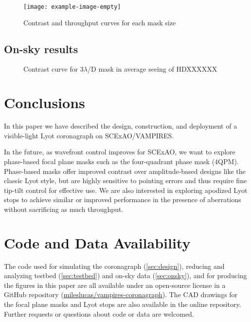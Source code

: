 \documentclass[]{spie}  %
\begin{document}
\begin{figure}
   \centering
   \texttt{[image: example-image-empty]}
   \caption{Contrast and throughput curves for each mask size}\label{fig:contrast}
\end{figure}

\subsection{On-sky results}\label{sec:onsky}


\begin{figure}
   \centering
   \caption{Contrast curve for 3$\lambda$/D mask in average seeing of HDXXXXXX}\label{fig:onsky-contrast}
\end{figure}

\section{Conclusions}\label{sec:conclusions}

In this paper we have described the design, construction, and deployment of a visible-light Lyot coronagraph on SCExAO/VAMPIRES.

In the future, as wavefront control improves for SCExAO, we want to explore phase-based focal plane masks such as the four-quadrant phase mask (4QPM)\cite{rouanFourQuadrantPhase2007}. Phase-based masks offer improved contrast over amplitude-based designs like the classic Lyot style, but are highly sensitive to pointing errors and thus require fine tip-tilt control for effective use\cite{huby2017}. We are also interested in exploring apodized Lyot stops to achieve similar or improved performance in the presence of aberrations without sacrificing as much throughput.


\appendix    %


\section{Code and Data Availability}\label{sec:code}

The code used for simulating the coronagraph (\autoref{sec:design}), reducing and analyzing testbed (\autoref{sec:testbed}) and on-sky data (\autoref{sec:onsky}), and for producing the figures in this paper are all available under an open-source license in a GitHub repository (\href{https://github.com/mileslucas/vampires-coronagraph}{mileslucas/vampires-coronagraph}). The CAD drawings for the focal plane masks and Lyot stops are also available in the online repository. Further requests or questions about code or data are welcomed.
\end{document}

